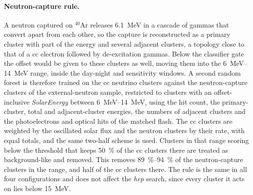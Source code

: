\paragraph{Neutron-capture rule.} A neutron captured on $^{40}$Ar releases \SI{6.1}{\mega\electronvolt} in a cascade of gammas that convert apart from each other, so the capture is reconstructed as a primary cluster with part of the energy and several adjacent clusters, a topology close to that of a \gls{cc} electron followed by de-excitation gammas. Below the classifier gate the offset would be given to these clusters as well, moving them into the \qtyrange{6}{14}{\mega\electronvolt} range, inside the day-night and sensitivity windows. A second random forest is therefore trained on the \gls{cc} neutrino clusters against the neutron-capture clusters of the external-neutron sample, restricted to clusters with an offset-inclusive \emph{SolarEnergy} between \qtyrange{6}{14}{\mega\electronvolt}, using the hit count, the primary-cluster, total and adjacent-cluster energies, the numbers of adjacent clusters and the photoelectrons and optical hits of the matched flash. The \gls{cc} clusters are weighted by the oscillated solar flux and the neutron clusters by their rate, with equal totals, and the same two-half scheme is used. Clusters in that range scoring below the threshold that keeps \SI{50}{\percent} of the \gls{cc} clusters there are treated as background-like and removed. This removes \qtyrange{89}{94}{\percent} of the neutron-capture clusters in the range, and half of the \gls{cc} clusters there. The rule is the same in all four configurations and does not affect the \emph{hep} search, since every cluster it acts on lies below \SI{15}{\mega\electronvolt}.

